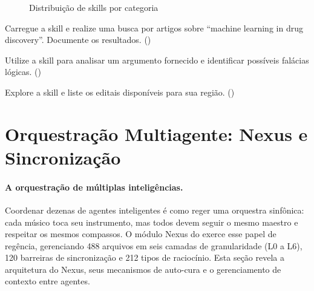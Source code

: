 \begin{figure}[htb]
\centering
\caption{Distribuição de skills por categoria}
\label{fig:skill-categories}
\end{figure}

\begin{exercicio}
Carregue a skill  e realize uma busca por
artigos sobre ``machine learning in drug discovery''. Documente os
resultados. (\nivelintermediario)
\end{exercicio}

\begin{exercicio}
Utilize a skill  para analisar um argumento
fornecido e identificar possíveis falácias lógicas. (\nivelavancado)
\end{exercicio}

\begin{exercicio}
Explore a skill  e liste os editais
disponíveis para sua região. (\nivelintermediario)
\end{exercicio}

\section{Orquestração Multiagente: Nexus e Sincronização}
\label{sec:nexus}
\nivelphd

\paragraph{A orquestração de múltiplas inteligências.} Coordenar dezenas de agentes inteligentes é como reger uma orquestra sinfônica: cada músico toca seu instrumento, mas todos devem seguir o mesmo maestro e respeitar os mesmos compassos. O módulo Nexus do \opencodeeco{} exerce esse papel de regência, gerenciando 488 arquivos em seis camadas de granularidade (L0 a L6), 120 barreiras de sincronização e 212 tipos de raciocínio. Esta seção revela a arquitetura do Nexus, seus mecanismos de auto-cura e o gerenciamento de contexto entre agentes.

